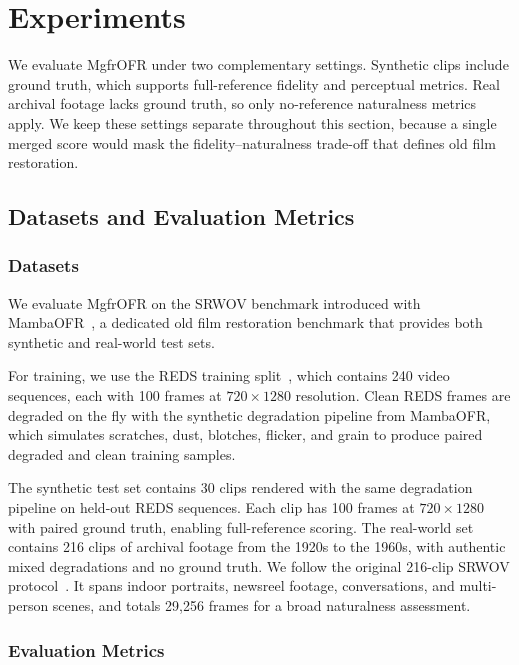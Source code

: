 \section{Experiments}
\label{sec:experiment}

We evaluate MgfrOFR under two complementary settings. Synthetic clips include ground truth, which supports full-reference fidelity and perceptual metrics. Real archival footage lacks ground truth, so only no-reference naturalness metrics apply. We keep these settings separate throughout this section, because a single merged score would mask the fidelity--naturalness trade-off that defines old film restoration.

\subsection{Datasets and Evaluation Metrics}
\label{subsec:datasets_metrics}

\subsubsection{Datasets}
\label{subsec:datasets}

We evaluate MgfrOFR on the SRWOV benchmark introduced with MambaOFR~\cite{mao2025mambaofr}, a dedicated old film restoration benchmark that provides both synthetic and real-world test sets.

For training, we use the REDS training split~\cite{nah2019reds}, which contains 240 video sequences, each with 100 frames at $720 \times 1280$ resolution. Clean REDS frames are degraded on the fly with the synthetic degradation pipeline from MambaOFR, which simulates scratches, dust, blotches, flicker, and grain to produce paired degraded and clean training samples.

The synthetic test set contains 30 clips rendered with the same degradation pipeline on held-out REDS sequences. Each clip has 100 frames at $720 \times 1280$ with paired ground truth, enabling full-reference scoring. The real-world set contains 216 clips of archival footage from the 1920s to the 1960s, with authentic mixed degradations and no ground truth. We follow the original 216-clip SRWOV protocol~\cite{mao2025mambaofr}. It spans indoor portraits, newsreel footage, conversations, and multi-person scenes, and totals 29{,}256 frames for a broad naturalness assessment.

\subsubsection{Evaluation Metrics}
\label{subsec:eval_metrics}

